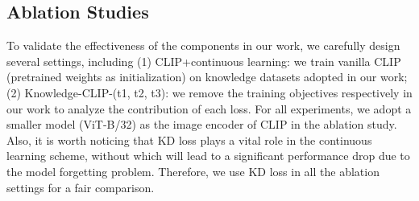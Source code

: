 \begin{table}[t]
    \centering
    \caption{Fine-tuned language understanding results on GLUE dataset. The best result is shown in \textcolor{blue}{blue} and the better result between CLIP and our approach is shown in \textbf{bold}.}
    \vskip -0.05in  
    \label{glue}
\end{table}

\subsection{Ablation Studies}
To validate the effectiveness of the components in our work, we carefully design several settings, including (1) CLIP+continuous learning: we train vanilla CLIP (pretrained weights as initialization) on knowledge datasets adopted in our work; (2) Knowledge-CLIP-(t1, t2, t3): we remove the training objectives respectively in our work to analyze the contribution of each loss.
For all experiments, we adopt a smaller model (ViT-B/32) as the image encoder of CLIP in the ablation study. Also, it is worth noticing that KD loss plays a vital role in the continuous learning scheme, without which will lead to a significant performance drop due to the model forgetting problem. Therefore, we use KD loss in all the ablation settings for a fair comparison.

